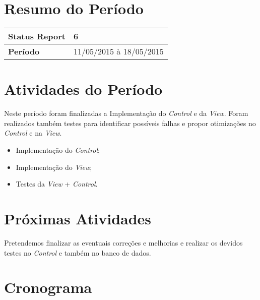 \documentclass[a4paper,12pt]{article}
\begin{document}

\newpage

\section{Resumo do Período}

\begin{longtable}{|l|l|}
\hline
\textbf{Status Report} & 6\\
\hline
\textbf{Período}	&	11/05/2015 à 18/05/2015 \\
\hline
\end{longtable}


\section{Atividades do Período}

Neste período foram finalizadas a Implementação do \textit{Control} e da \textit{View}. Foram realizados também testes para identificar possíveis falhas e propor otimizações no \textit{Control} e na \textit{View}.

\begin{itemize}

\item{Implementação do \textit{Control};}

\item{Implementação do \textit{View};}

\item{Testes da \textit{View} + \textit{Control}.}


\end{itemize}



\section{Próximas Atividades}

Pretendemos finalizar as eventuais correções e melhorias e realizar os devidos testes no \textit{Control} e também no banco de dados.

\newpage
\section{Cronograma}
\end{document}
